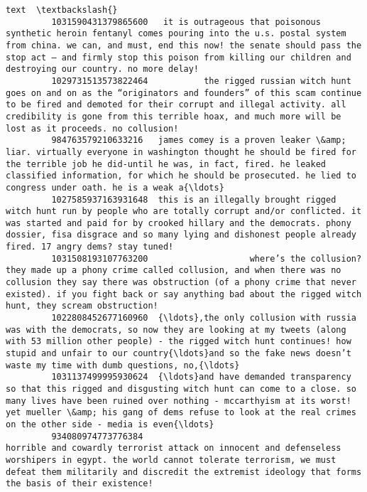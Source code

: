 \documentclass[11pt]{article}
\begin{document}
\begin{Verbatim}[commandchars=\\\{\}]
                                                                                                                                                                                                                                                                                                                 text  \textbackslash{}
         1031590431379865600   it is outrageous that poisonous synthetic heroin fentanyl comes pouring into the u.s. postal system from china. we can, and must, end this now! the senate should pass the stop act – and firmly stop this poison from killing our children and destroying our country. no more delay!   
         1029731513573822464           the rigged russian witch hunt goes on and on as the “originators and founders” of this scam continue to be fired and demoted for their corrupt and illegal activity. all credibility is gone from this terrible hoax, and much more will be lost as it proceeds. no collusion!   
         984763579210633216   james comey is a proven leaker \&amp; liar. virtually everyone in washington thought he should be fired for the terrible job he did-until he was, in fact, fired. he leaked classified information, for which he should be prosecuted. he lied to congress under oath. he is a weak a{\ldots}   
         1027585937163931648  this is an illegally brought rigged witch hunt run by people who are totally corrupt and/or conflicted. it was started and paid for by crooked hillary and the democrats. phony dossier, fisa disgrace and so many lying and dishonest people already fired. 17 angry dems? stay tuned!   
         1031508193107763200                    where’s the collusion? they made up a phony crime called collusion, and when there was no collusion they say there was obstruction (of a phony crime that never existed). if you fight back or say anything bad about the rigged witch hunt, they scream obstruction!   
         1022808452677160960  {\ldots},the only collusion with russia was with the democrats, so now they are looking at my tweets (along with 53 million other people) - the rigged witch hunt continues! how stupid and unfair to our country{\ldots}and so the fake news doesn’t waste my time with dumb questions, no,{\ldots}   
         1031137499995930624  {\ldots}and have demanded transparency so that this rigged and disgusting witch hunt can come to a close. so many lives have been ruined over nothing - mccarthyism at its worst! yet mueller \&amp; his gang of dems refuse to look at the real crimes on the other side - media is even{\ldots}   
         934080974773776384                                                 horrible and cowardly terrorist attack on innocent and defenseless worshipers in egypt. the world cannot tolerate terrorism, we must defeat them militarily and discredit the extremist ideology that forms the basis of their existence!   

\end{Verbatim}
\end{document}
